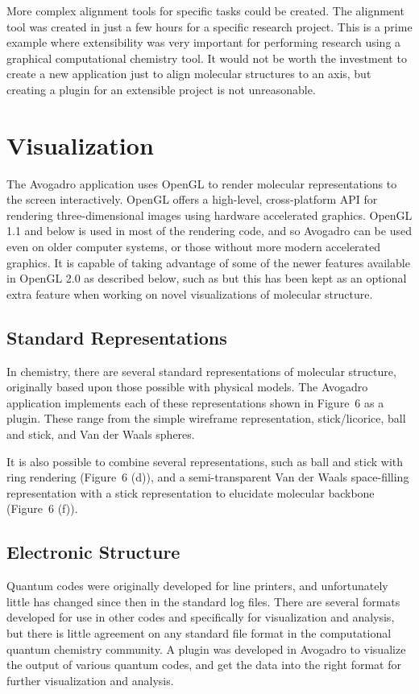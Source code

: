 \documentclass[10pt]{bmc_article}
\newenvironment{bmcformat}{\begin{raggedright}
  \baselineskip20pt\sloppy\setboolean{publ}{false}}{\end{raggedright}
  \baselineskip20pt\sloppy}
\begin{document}
\begin{bmcformat}
More complex alignment tools for specific tasks could be created. The alignment
tool was created in just a few hours for a specific research project. This is a prime
example where extensibility was very important for performing
research using a graphical computational chemistry tool. It would not be
worth the investment to create a new application just to align molecular
structures to an axis, but creating a plugin for an extensible project is not
unreasonable.


\section*{Visualization}

The Avogadro application uses OpenGL to render molecular representations to the
screen interactively. OpenGL offers a high-level, cross-platform API for rendering
three-dimensional images using hardware accelerated graphics. OpenGL
1.1 and below is used in most of the rendering code, and so Avogadro can be used
even on older computer systems, or those without more modern
accelerated graphics. It is capable of taking advantage of some of the
newer features available in OpenGL 2.0 as described below, such as but
this has been kept as an optional extra feature when working on novel
visualizations of molecular structure.

\subsection*{Standard Representations}

In chemistry, there are several standard representations of molecular structure,
originally based upon those possible with physical models. The Avogadro
application implements each of these representations shown in
Figure~6 as a plugin. These range from the simple wireframe
representation, stick/licorice, ball and stick, and Van der Waals spheres.

It is also possible to combine several representations, such as ball and stick
with ring rendering (Figure~6 (d)), and a semi-transparent Van
der Waals space-filling representation with a stick representation to elucidate
molecular backbone (Figure~6 (f)).

\subsection*{Electronic Structure}

Quantum codes were originally developed for line printers, and unfortunately little has
changed since then in the standard log files. There are several formats developed for
use in other codes and specifically for visualization and analysis, but there is little
agreement on any standard file format in the computational quantum chemistry
community. A plugin was developed in Avogadro to visualize the output of various
quantum codes, and get the data into the right format for further visualization and
analysis.


\end{bmcformat}
\end{document}
